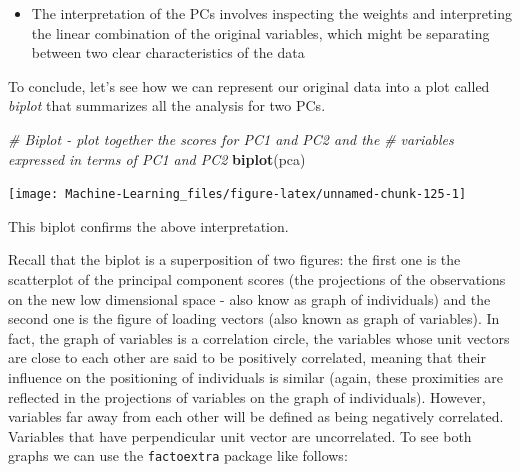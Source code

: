 \documentclass[]{book}
\newenvironment{Shaded}{\begin{snugshade}}{\end{snugshade}}
\newcommand{\KeywordTok}[1]{\textcolor[rgb]{0.13,0.29,0.53}{\textbf{#1}}}
\newcommand{\DataTypeTok}[1]{\textcolor[rgb]{0.13,0.29,0.53}{#1}}
\newcommand{\StringTok}[1]{\textcolor[rgb]{0.31,0.60,0.02}{#1}}
\newcommand{\CommentTok}[1]{\textcolor[rgb]{0.56,0.35,0.01}{\textit{#1}}}
\newcommand{\OtherTok}[1]{\textcolor[rgb]{0.56,0.35,0.01}{#1}}
\newcommand{\NormalTok}[1]{#1}
\newenvironment{rmdblock}[1]
  {\begin{shaded*}
  \begin{itemize}
  \renewcommand{\labelitemi}{
    \raisebox{-.7\height}[0pt][0pt]{
      {\setkeys{Gin}{width=2em,keepaspectratio}\texttt{[image: img/icons/\#1]}}
    }
  }
  \item
  }
  {
  \end{itemize}
  \end{shaded*}
  }
\newenvironment{rmdtip}
  {\begin{rmdblock}{tip}}
  {\end{rmdblock}}
\theoremstyle{definition}
\theoremstyle{definition}
\theoremstyle{definition}
\theoremstyle{remark}
\begin{document}
\begin{rmdtip}
The interpretation of the PCs involves inspecting the weights and
interpreting the linear combination of the original variables, which
might be separating between two clear characteristics of the data
\end{rmdtip}

To conclude, let's see how we can represent our original data into a
plot called \emph{biplot} that summarizes all the analysis for two PCs.

\begin{Shaded}
\begin{Highlighting}[]
\CommentTok{# Biplot - plot together the scores for PC1 and PC2 and the}
\CommentTok{# variables expressed in terms of PC1 and PC2}
\KeywordTok{biplot}\NormalTok{(pca)}
\end{Highlighting}
\end{Shaded}

\begin{center}\texttt{[image: Machine-Learning\_files/figure-latex/unnamed-chunk-125-1]} \end{center}

This biplot confirms the above interpretation.

Recall that the biplot is a superposition of two figures: the first one
is the scatterplot of the principal component scores (the projections of
the observations on the new low dimensional space - also know as graph
of individuals) and the second one is the figure of loading vectors
(also known as graph of variables). In fact, the graph of variables is a
correlation circle, the variables whose unit vectors are close to each
other are said to be positively correlated, meaning that their influence
on the positioning of individuals is similar (again, these proximities
are reflected in the projections of variables on the graph of
individuals). However, variables far away from each other will be
defined as being negatively correlated. Variables that have
perpendicular unit vector are uncorrelated. To see both graphs we can
use the \texttt{factoextra} package like follows:

\begin{Shaded}
\end{Shaded}
\end{document}
